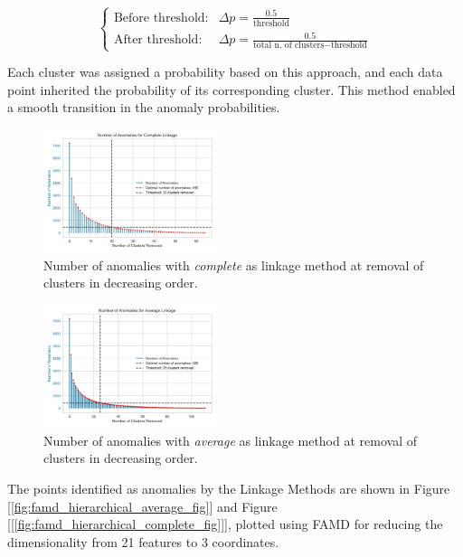 \documentclass[a4paper]{article}
\begin{document}
$$\begin{cases}
    \text{Before threshold:} & \Delta p = \frac{0.5}{\text{threshold}} \\
    \text{After threshold:} & \Delta p = \frac{0.5}{\text{total n. of clusters} - \text{threshold}}
\end{cases}$$

Each cluster was assigned a probability based on this approach, and each data point inherited the probability of its corresponding cluster. This method enabled a smooth transition in the anomaly probabilities.

\begin{figure}
    \centering
    \includegraphics[width=0.45\textwidth]{images/anomalies_complete_linkage.png}
    \caption{Number of anomalies with \textit{complete} as linkage method at removal of clusters in decreasing order.}
    \label{fig:anomalies_complete_linkage}
\end{figure}

\begin{figure}
    \centering
    \includegraphics[width=0.45\textwidth]{images/anomalies_average_linkage.png}
    \caption{Number of anomalies with \textit{average} as linkage method at removal of clusters in decreasing order.}
    \label{fig:anomalies_average_linkage}
\end{figure}

The points identified as anomalies by the Linkage Methods are shown in Figure [\ref{fig:famd_hierarchical_average_fig}] and Figure [[\ref{fig:famd_hierarchical_complete_fig}]], plotted using FAMD for reducing the dimensionality from 21 features to 3 coordinates.
\end{document}
